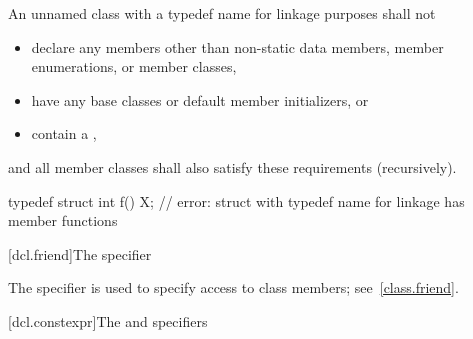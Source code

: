 \pnum
An unnamed class with a typedef name for linkage purposes shall not
\begin{itemize}
\item
  declare any members
  other than non-static data members, member enumerations, or member classes,
\item
  have any base classes or default member initializers, or
\item
  contain a ,
\end{itemize}
and all member classes shall also satisfy these requirements (recursively).
\begin{example}
\begin{codeblock}
typedef struct {
  int f() {}
} X;                            // error: struct with typedef name for linkage has member functions
\end{codeblock}
\end{example}

[dcl.friend]{The  specifier}%

\pnum
The  specifier is used to specify access to class members;
see~\ref{class.friend}.

[dcl.constexpr]{The  and  specifiers}%

